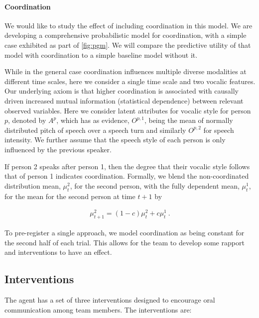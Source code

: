     \paragraph{Coordination} We would like to study the effect of including
    coordination in this model.  We are developing a comprehensive
    probabilistic model for coordination, with a simple case exhibited as part
    of \autoref{fig:pgm}.  We will compare the predictive utility of that model
    with coordination to a simple baseline model without it.

    While in the general case coordination influences multiple diverse
    modalities at different time scales, here we consider a single time scale
    and two vocalic features.  Our underlying axiom is that higher coordination
    is associated with causally driven increased mutual information (statistical
    dependence) between relevant observed variables. Here we consider latent
    attributes for vocalic style for person $p$, denoted by $A^{p}$, which has
    as evidence, $O^{p,1}$, being the mean of normally distributed pitch of
    speech over a speech turn and similarly $O^{p,2}$ for speech intensity.  We
    further assume that the speech style of each person is only influenced by
    the previous speaker.

    If person 2 speaks after person 1, then the degree that their vocalic style
    follows that of person 1 indicates coordination. Formally, we blend the
    non-coordinated distribution mean, $\mu^2_t$, for the second person, with
    the fully dependent mean, $\mu^1_t$, for the mean for the second person at
    time $t+1$ by

    \begin{align}
        \mu^2_{t+1} = (1-c) \mu^2_t + c\mu^1_t ~.
    \end{align}

    To pre-register a single approach, we model coordination as being constant
    for the second half of each trial. This allows for the team to develop some
    rapport and interventions to have an effect. 

\subsection{Interventions}
\label{subsec:interventions}

The agent has a set of three interventions designed to encourage oral
communication among team members. The interventions are:

